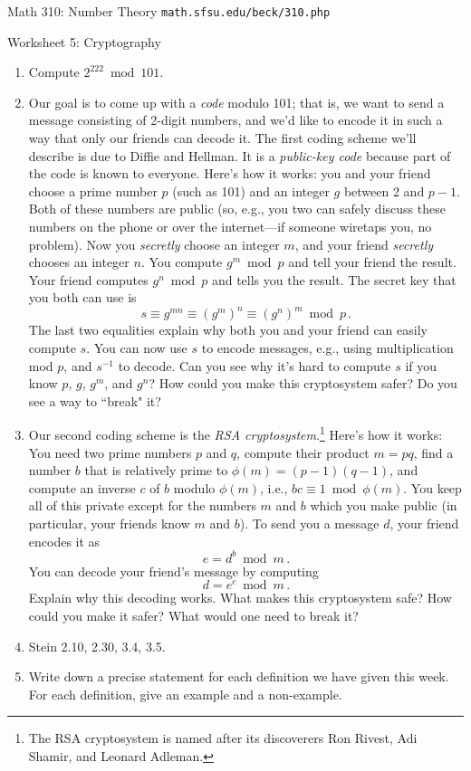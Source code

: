 \documentclass[11pt]{article}
\begin{document}
\setlength{\parindent}{0pt}
\setlength{\parskip}{0.2cm}

{ Math 310: Number Theory}
\hfill
{\tt math.sfsu.edu/beck/310.php}

\vspace{.3in}

\begin{center}
\Large{Worksheet 5: Cryptography}
\end{center}

\begin{enumerate}

\item Compute $2^{ 222 } \bmod 101$.

\item Our goal is to come up with a \emph{code} modulo 101; that is, we want to send a message consisting of 2-digit
numbers, and we'd like to encode it in such a way that only our friends can decode it.
The first coding scheme we'll describe is due to Diffie and Hellman. It is a \emph{public-key code} because
part of the code is known to everyone. Here's how it works: you and your friend choose a prime number $p$ (such as 101) and an integer $g$ between 2 and $p-1$. Both of these numbers are public (so, e.g., you two can safely discuss these
numbers on the phone or over the internet---if someone wiretaps you, no problem).
Now you \emph{secretly} choose an integer $m$, and your friend \emph{secretly} chooses an integer $n$. You compute
$g^m \bmod p$ and tell your friend the result. Your friend computes $g^n \bmod p$ and tells you the result. The
secret key that you both can use is
\[
  s \equiv g^{ mn } \equiv \left( g^m \right)^n \equiv \left( g^n \right)^m \bmod p \, .
\]
The last two equalities explain why both you and your friend can easily compute $s$.
You can now use $s$ to encode messages, e.g., using multiplication mod $p$, and $s^{ -1 }$ to decode.
Can you see why it's hard to compute $s$ if you know $p$, $g$, $g^m$, and $g^n$? How could you make this
cryptosystem safer? Do you see a way to ``break" it?

\item Our second coding scheme is the \emph{RSA cryptosystem}.\footnote{
The RSA cryptosystem is named after its discoverers Ron Rivest, Adi Shamir, and Leonard Adleman.
}
Here's how it works: You need two prime numbers $p$ and $q$, compute their product $m = pq$, find a number $b$ that
is relatively prime to $\phi(m) = (p-1)(q-1)$, and compute an inverse $c$ of $b$ modulo $\phi(m)$, i.e., $bc \equiv
1 \bmod \phi(m)$.
You keep all of this private except for the numbers $m$ and $b$ which you make public (in particular, your friends
know $m$ and $b$). To send you a message $d$, your friend encodes it as
\[
  e = d^b \bmod m \, .
\]
You can decode your friend's message by computing
\[
  d = e^c \bmod m \, .
\]
Explain why this decoding works.
What makes this cryptosystem safe? How could you make it safer? What would one need to break it?

\item Stein 2.10, 2.30, 3.4, 3.5.
 
\item Write down a precise statement for each definition we have given this week.
For each definition, give an example and a non-example.

\end{enumerate}
\end{document}
